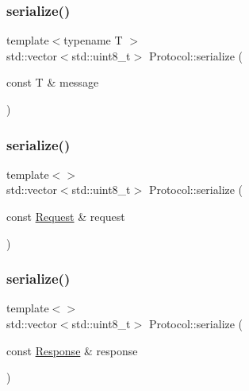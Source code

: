\mbox{\label{namespaceProtocol_aed66655af8e41eb84311b69e0f1cbbad}} 
\subsubsection{\texorpdfstring{serialize()}{serialize()}\hspace{0.1cm}{\footnotesize\ttfamily [1/3]}}
{\footnotesize\ttfamily template$<$typename T $>$ \\
std\+::vector$<$std\+::uint8\+\_\+t$>$ Protocol\+::serialize (\begin{DoxyParamCaption}\item[{const T \&}]{message }\end{DoxyParamCaption})}

\mbox{\label{namespaceProtocol_a9eadcd3ffc63dc592406a7acd8ad68bc}} 
\subsubsection{\texorpdfstring{serialize()}{serialize()}\hspace{0.1cm}{\footnotesize\ttfamily [2/3]}}
{\footnotesize\ttfamily template$<$$>$ \\
std\+::vector$<$std\+::uint8\+\_\+t$>$ Protocol\+::serialize (\begin{DoxyParamCaption}\item[{const \hyperlink{structProtocol_1_1Request}{Request} \&}]{request }\end{DoxyParamCaption})}

\mbox{\label{namespaceProtocol_a235264aa75bf1d2e3c561787c2af2573}} 
\subsubsection{\texorpdfstring{serialize()}{serialize()}\hspace{0.1cm}{\footnotesize\ttfamily [3/3]}}
{\footnotesize\ttfamily template$<$$>$ \\
std\+::vector$<$std\+::uint8\+\_\+t$>$ Protocol\+::serialize (\begin{DoxyParamCaption}\item[{const \hyperlink{structProtocol_1_1Response}{Response} \&}]{response }\end{DoxyParamCaption})}

